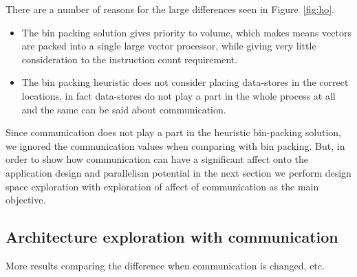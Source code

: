 There are a number of reasons for the large differences seen in
Figure~\ref{fig:ho}.

\begin{itemize}

\item The bin packing solution gives priority to volume, which makes
  means vectors are packed into a single large vector processor, while
  giving very little consideration to the instruction count requirement.

\item The bin packing heuristic does not consider placing data-stores in
  the correct locations, in fact data-stores do not play a part in the
  whole process at all and the same can be said about communication.

\end{itemize}

Since communication does not play a part in the heuristic bin-packing
solution, we ignored the communication values when comparing with bin
packing. But, in order to show how communication can have a significant
affect onto the application design and parallelism potential in the next
section we perform design space exploration with exploration of affect
of communication as the main objective.

\subsection{Architecture exploration with communication}
\label{sec:arch-expl-with}

More results comparing the difference when communication is changed, etc.


